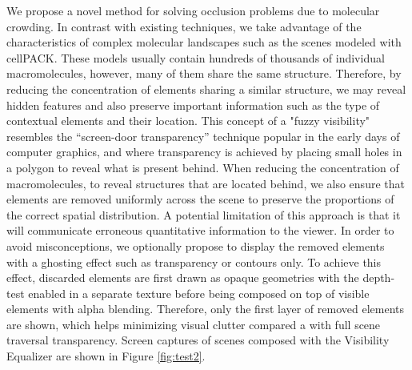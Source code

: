 We propose a novel method for solving occlusion problems due to molecular crowding.
In contrast with existing techniques, we take advantage of the characteristics of complex molecular landscapes such as the scenes modeled with cellPACK.
These models usually contain hundreds of thousands of individual macromolecules, however, many of them share the same structure.
Therefore, by reducing the concentration of elements sharing a similar structure, we may reveal hidden features and also preserve important information such as the type of contextual elements and their location.
This concept of a "fuzzy visibility" resembles the “screen-door transparency” technique popular in the early days of computer graphics, and where transparency is achieved by placing small holes in a polygon to reveal what is present behind.
When reducing the concentration of macromolecules, to reveal structures that are located behind, we also ensure that elements are removed uniformly across the scene to preserve the proportions of the correct spatial distribution.
A potential limitation of this approach is that it will communicate erroneous quantitative information to the viewer.
In order to avoid misconceptions, we optionally propose to display the removed elements with a ghosting effect such as transparency or contours only.
To achieve this effect, discarded elements are first drawn as opaque geometries with the depth-test enabled in a separate texture before being composed on top of visible elements with alpha blending.
Therefore, only the first layer of removed elements are shown, which helps minimizing visual clutter compared a with full scene traversal transparency.
Screen captures of scenes composed with the Visibility Equalizer are shown in Figure \ref{fig:test2}.

